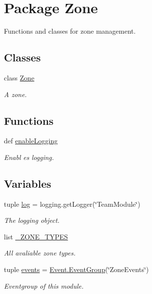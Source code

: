 \hypertarget{namespace_zone}{
\section{Package Zone}
\label{namespace_zone}
}


Functions and classes for zone management.  


\subsection*{Classes}
\begin{DoxyCompactItemize}
\item 
class \hyperlink{class_zone_1_1_zone}{Zone}
\begin{DoxyCompactList}\small\item\em A zone. \item\end{DoxyCompactList}\end{DoxyCompactItemize}
\subsection*{Functions}
\begin{DoxyCompactItemize}
\item 
def \hyperlink{namespace_zone_aaa40a627f781a072131be03ac8e08328}{enableLogging}
\begin{DoxyCompactList}\small\item\em Enabl es logging. \item\end{DoxyCompactList}\end{DoxyCompactItemize}
\subsection*{Variables}
\begin{DoxyCompactItemize}
\item 
tuple \hyperlink{namespace_zone_aad90704d2c88929bd92b7acf2b9a09d6}{log} = logging.getLogger(\char`\"{}TeamModule\char`\"{})
\begin{DoxyCompactList}\small\item\em The logging object. \item\end{DoxyCompactList}\item 
list \hyperlink{namespace_zone_a8dcf5d84aac63b42f1ce7684c3b4ea91}{\_\-ZONE\_\-TYPES}
\begin{DoxyCompactList}\small\item\em All avaliable zone types. \item\end{DoxyCompactList}\item 
tuple \hyperlink{namespace_zone_a2cf3edd088ca6482872ba018b81ef52a}{events} = \hyperlink{class_event_1_1_event_group}{Event.EventGroup}(\char`\"{}ZoneEvents\char`\"{})
\begin{DoxyCompactList}\small\item\em Eventgroup of this module. \item\end{DoxyCompactList}\end{DoxyCompactItemize}


